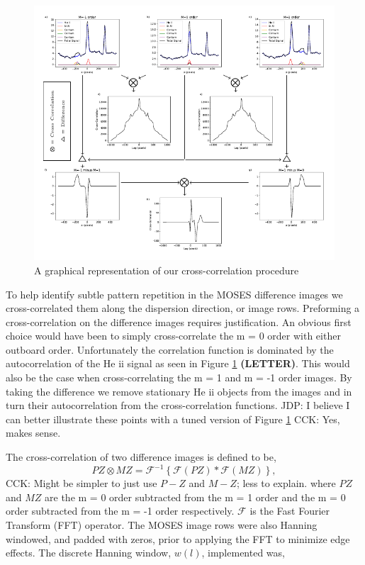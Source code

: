 \documentclass[]{solarphysics}
\newcommand{\cck}[1]{{\color{red} CCK: #1}} %
\newcommand{\jdp}[1]{{\color{blue} JDP: #1}} %
\begin{document}
\begin{article}
 	 	\begin{figure}
 	 		\includegraphics[scale = 1]{methods_fig.pdf}
 	 		\caption{A graphical representation of our cross-correlation procedure}
 	 		\label{fig:methods}
 	 	\end{figure}
	
 	To help identify subtle pattern repetition in the MOSES difference images we cross-correlated them along the dispersion direction, or image rows.   Preforming a cross-correlation on the difference images requires justification.  An obvious first choice would have been to simply cross-correlate the m = 0 order with either outboard order.  Unfortunately the correlation function is dominated by the autocorrelation of the He {\sc ii} signal as seen in Figure \ref{fig:methods} \textbf{(LETTER)}.  This would also be the case when cross-correlating the m = 1 and m = -1 order images.  By taking the difference we remove stationary He {\sc ii} objects from the images and in turn their autocorrelation from the cross-correlation functions.  \jdp{I believe I can better illustrate these points with a tuned version of Figure \ref{fig:methods}} \cck{Yes, makes sense.}
 	
 	The cross-correlation of two difference images is defined to be,
	 	\begin{equation}
		 	PZ \otimes MZ = \mathcal{F}^{-1} \left\{\mathcal{F}\left(PZ \right)*\mathcal{F}\left(MZ \right)  \right\},
		 	\label{eqn:cross_correlate}
	 	\end{equation}
        \cck{Might be simpler to just use $P-Z$ and $M-Z$; less to explain.}
 	where $PZ$ and $MZ$ are the m = 0 order subtracted from the m = 1 order and the m = 0 order subtracted from the m = -1 order respectively. $\mathcal{F}$ is the Fast Fourier Transform (FFT) operator.  The MOSES image rows were also Hanning windowed, and padded with zeros, prior to applying the FFT to minimize edge effects.  The discrete Hanning window, $w(l)$, implemented was,
 	

\end{article}
\end{document}
